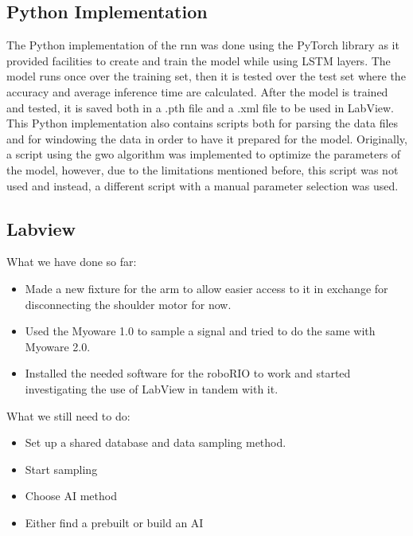 \subsection{Python Implementation}
The Python implementation of the \acrshort{rnn} was done using the PyTorch library as it provided facilities 
to create and train the model while using LSTM layers. The model runs once over the training set, then it is 
tested over the test set where the accuracy and average inference time are calculated. After the model is trained 
and tested, it is saved both in a .pth file and a .xml file to be used in LabView.
This Python implementation also contains scripts both for parsing the data files and for windowing the data in 
order to have it prepared for the model. Originally, a script using the \acrshort{gwo} algorithm was implemented 
to optimize the parameters of the model, however, due to the limitations mentioned before, this script was not 
used and instead, a different script with a manual parameter selection was used.

\subsection{Labview}

What we have done so far: 

\begin{itemize}
    
    \item Made a new fixture for the arm to allow easier access to it in exchange for disconnecting the shoulder motor for now.
    
    \item Used the Myoware 1.0 to sample a signal and tried to do the same with Myoware 2.0.
    
    \item Installed the needed software for the roboRIO to work and started investigating the use of LabView in tandem with it.
    
\end{itemize}
What we still need to do:
\begin{itemize}    
    \item Set up a shared database and data sampling method.
    
    \item Start sampling
    
    \item Choose AI method
    
    \item Either find a prebuilt or build an AI
\end{itemize}